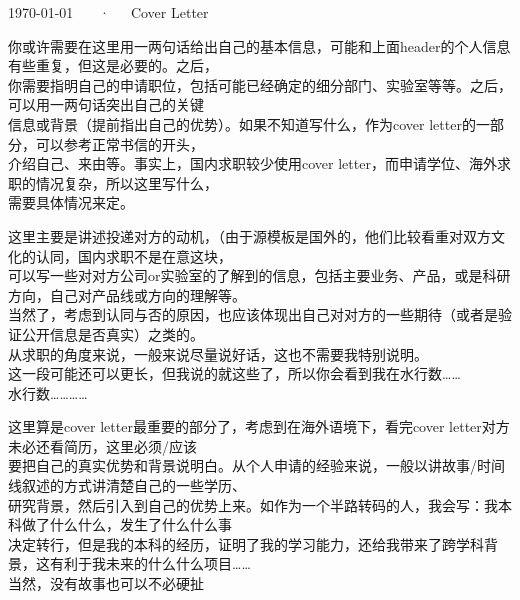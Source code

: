 \documentclass[11pt, a4paper]{awesome-cv}
\begin{document}
\makecvheader[R]

\makecvfooter
  {\today}
  {~~~·~~~Cover Letter}
  {}

\makelettertitle

\begin{cvletter}

你或许需要在这里用一两句话给出自己的基本信息，可能和上面header的个人信息有些重复，但这是必要的。之后，\\你需要指明自己的申请职位，包括可能已经确定的细分部门、实验室等等。之后，可以用一两句话突出自己的关键\\信息或背景（提前指出自己的优势）。如果不知道写什么，作为cover letter的一部分，可以参考正常书信的开头，\\介绍自己、来由等。事实上，国内求职较少使用cover letter，而申请学位、海外求职的情况复杂，所以这里写什么，\\需要具体情况来定。

这里主要是讲述投递对方的动机，（由于源模板是国外的，他们比较看重对双方文化的认同，国内求职不是在意这块，\\可以写一些对对方公司or实验室的了解到的信息，包括主要业务、产品，或是科研方向，自己对产品线或方向的理解等。\\当然了，考虑到认同与否的原因，也应该体现出自己对对方的一些期待（或者是验证公开信息是否真实）之类的。\\从求职的角度来说，一般来说尽量说好话，这也不需要我特别说明。
\\这一段可能还可以更长，但我说的就这些了，所以你会看到我在水行数……
\\水行数…………

这里算是cover letter最重要的部分了，考虑到在海外语境下，看完cover letter对方未必还看简历，这里必须/应该\\要把自己的真实优势和背景说明白。从个人申请的经验来说，一般以讲故事/时间线叙述的方式讲清楚自己的一些学历、\\研究背景，然后引入到自己的优势上来。如作为一个半路转码的人，我会写：我本科做了什么什么，发生了什么什么事\\决定转行，但是我的本科的经历，证明了我的学习能力，还给我带来了跨学科背景，这有利于我未来的什么什么项目……\\当然，没有故事也可以不必硬扯

\end{cvletter}


\makeletterclosing
\end{document}
